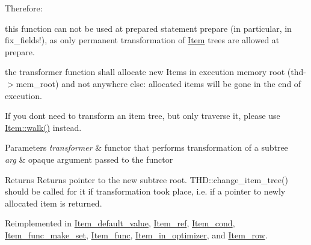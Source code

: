 Therefore\+:
\begin{DoxyItemize}
\item this function can not be used at prepared statement prepare (in particular, in fix\+\_\+fields!), as only permanent transformation of \mbox{\hyperlink{classItem}{Item}} trees are allowed at prepare.
\item the transformer function shall allocate new Items in execution memory root (thd-\/$>$mem\+\_\+root) and not anywhere else\+: allocated items will be gone in the end of execution.
\end{DoxyItemize}

If you don\textquotesingle{}t need to transform an item tree, but only traverse it, please use \mbox{\hyperlink{classItem_ab7d2529511c14a77e59a1b1bbabc95d7}{Item\+::walk()}} instead.


\begin{DoxyParams}{Parameters}
{\em transformer} & functor that performs transformation of a subtree \\
\hline
{\em arg} & opaque argument passed to the functor\\
\hline
\end{DoxyParams}
\begin{DoxyReturn}{Returns}
Returns pointer to the new subtree root. T\+H\+D\+::change\+\_\+item\+\_\+tree() should be called for it if transformation took place, i.\+e. if a pointer to newly allocated item is returned. 
\end{DoxyReturn}


Reimplemented in \mbox{\hyperlink{classItem__default__value_af8efb13ec5ade9320533c1e508d995ee}{Item\+\_\+default\+\_\+value}}, \mbox{\hyperlink{classItem__ref_a7918159b3087d8f56a9188e6469f1fd3}{Item\+\_\+ref}}, \mbox{\hyperlink{classItem__cond_a43e1bfb20c36bd6daa98d1243ef807fa}{Item\+\_\+cond}}, \mbox{\hyperlink{classItem__func__make__set_a7f76c6a1bd0ad1f4ecfc30eaa0165d21}{Item\+\_\+func\+\_\+make\+\_\+set}}, \mbox{\hyperlink{classItem__func_a808d0fe427eec3c050ee5214594b8908}{Item\+\_\+func}}, \mbox{\hyperlink{classItem__in__optimizer_abf3e3561b7ff2f5e6d58a343cc93fcc5}{Item\+\_\+in\+\_\+optimizer}}, and \mbox{\hyperlink{classItem__row_a708898ec64fe61e228a0f345d1657afb}{Item\+\_\+row}}.

\mbox{\label{classItem_a870059b0d80311b71b473af58329edd7}} 

